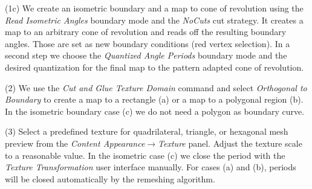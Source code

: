 \documentclass[Thesis.tex]{subfiles}
\begin{document}
\begin{compactenum}[(1)]
\begin{center}
\begin{minipage}{\linewidth}
            \centering
\end{minipage}
\end{center}

\item[(1c)] We create an isometric boundary and a map to cone of revolution using the \emph{Read Isometric Angles} boundary mode and the \emph{NoCuts} cut strategy. It creates a map to an arbitrary cone of revolution and reads off the resulting boundary angles. Those are set as new boundary conditions (red vertex selection). In a second step we choose the \emph{Quantized Angle Periods} boundary mode and the desired quantization for the final map to the pattern adapted cone of revolution.

\begin{center}
\begin{minipage}{\linewidth}
            \centering
\end{minipage}
\end{center}    

\item[(2)] We use the \emph{Cut and Glue Texture Domain} command and select \emph{Orthogonal to Boundary} to create a map to a rectangle (a) or a map to a polygonal region (b). In the isometric boundary case (c) we do not need a polygon as boundary curve.
\item[(3)] Select a predefined texture for quadrilateral, triangle, or hexagonal mesh preview from the \emph{Content Appearance$\to$Texture} panel. Adjust the texture scale to a reasonable value. In the isometric case (c) we close the period with the \emph{Texture Transformation} user interface manually. For cases (a) and (b), periods will be closed automatically by the remeshing algorithm.


\end{compactenum}
\end{document}
